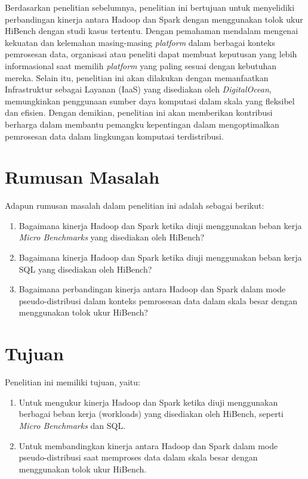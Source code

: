 
Berdasarkan penelitian sebelumnya, penelitian ini bertujuan untuk menyelidiki perbandingan kinerja antara Hadoop dan Spark dengan menggunakan tolok ukur HiBench dengan studi kasus tertentu. Dengan pemahaman mendalam mengenai kekuatan dan kelemahan masing-masing \textit{platform} dalam berbagai konteks pemrosesan data, organisasi atau peneliti dapat membuat keputusan yang lebih informasional saat memilih \textit{platform} yang paling sesuai dengan kebutuhan mereka. Selain itu, penelitian ini akan dilakukan dengan memanfaatkan Infrastruktur sebagai Layanan (IaaS) yang disediakan oleh \textit{DigitalOcean}, memungkinkan penggunaan sumber daya komputasi dalam skala yang fleksibel dan efisien. Dengan demikian, penelitian ini akan memberikan kontribusi berharga dalam membantu pemangku kepentingan dalam mengoptimalkan pemrosesan data dalam lingkungan komputasi terdistribusi.


\section{Rumusan Masalah}
Adapun rumusan masalah dalam penelitian ini adalah sebagai berikut:
\begin{enumerate}
	\item
	Bagaimana kinerja Hadoop dan Spark ketika diuji menggunakan  beban kerja \textit{Micro Benchmarks} yang disediakan oleh HiBench?
	\item 
	Bagaimana kinerja Hadoop dan Spark ketika diuji menggunakan  beban kerja SQL yang disediakan oleh HiBench?
	\item 
	Bagaimana perbandingan kinerja antara Hadoop dan Spark dalam mode pseudo-distribusi dalam konteks pemrosesan data dalam skala besar dengan menggunakan tolok ukur HiBench?
\end{enumerate}

\section{Tujuan}
Penelitian ini memiliki tujuan, yaitu:
	\begin{enumerate}
		\item
		Untuk mengukur kinerja Hadoop dan Spark ketika diuji menggunakan berbagai beban kerja (workloads) yang disediakan oleh HiBench, seperti \textit{Micro Benchmarks} dan SQL.
		\item 
		Untuk membandingkan kinerja antara Hadoop dan Spark dalam mode pseudo-distribusi saat memproses data dalam skala besar dengan menggunakan tolok ukur HiBench.
	\end{enumerate}

